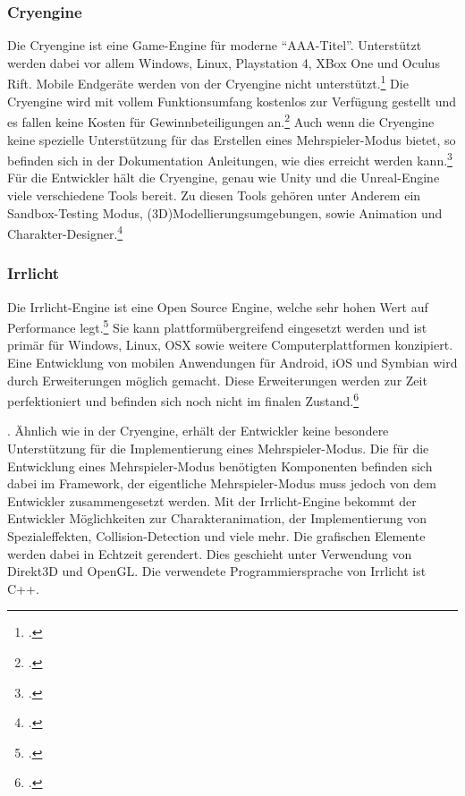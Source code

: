 	\subsubsection*{Cryengine}
	Die Cryengine ist eine Game-Engine für moderne \enquote{AAA-Titel}. Unterstützt werden dabei vor allem Windows, Linux, Playstation 4, XBox One und Oculus Rift. Mobile Endgeräte werden von der Cryengine nicht unterstützt.\footcite[\url{https://www.cryengine.com/features/platforms}]{cry-home} Die Cryengine wird mit vollem Funktionsumfang kostenlos zur Verfügung gestellt und es fallen keine Kosten für Gewinnbeteiligungen an.\footcite[\url{https://www.cryengine.com/features}]{cry-home} Auch wenn die Cryengine keine spezielle Unterstützung für das Erstellen eines Mehrspieler-Modus bietet, so befinden sich in der Dokumentation Anleitungen, wie dies erreicht werden kann.\footcite[\url{http://docs.cryengine.com/display/SDKDOC2/Multiplayer}]{cry-home} Für die Entwickler hält die Cryengine, genau wie Unity und die Unreal-Engine viele verschiedene Tools bereit. Zu diesen Tools gehören unter Anderem ein Sandbox-Testing Modus, (3D)Modellierungsumgebungen, sowie Animation und Charakter-Designer.\footcite[\url{https://www.cryengine.com/features}]{cry-home}

	\subsubsection*{Irrlicht}
	Die Irrlicht-Engine ist eine Open Source Engine, welche sehr hohen Wert auf Performance legt.\footcite[\url{http://irrlicht.sourceforge.net/}]{irrlicht-home} Sie kann plattformübergreifend eingesetzt werden und ist primär für Windows, Linux, OSX sowie weitere Computerplattformen konzipiert. Eine Entwicklung von mobilen Anwendungen für Android, iOS und Symbian wird durch Erweiterungen möglich gemacht. Diese Erweiterungen werden zur Zeit perfektioniert und befinden sich noch nicht im finalen Zustand.\footcite[\url{http://irrlicht.sourceforge.net/?page\_id=45}]{irrlicht-home}. Ähnlich wie in der Cryengine, erhält der Entwickler keine besondere Unterstützung für die Implementierung eines Mehrspieler-Modus. Die für die Entwicklung eines Mehrspieler-Modus benötigten Komponenten befinden sich dabei im Framework, der eigentliche Mehrspieler-Modus muss jedoch von dem Entwickler zusammengesetzt werden.\footnotemark{} Mit der Irrlicht-Engine bekommt der Entwickler Möglichkeiten zur Charakteranimation, der Implementierung von Spezialeffekten, Collision-Detection und viele mehr. Die grafischen Elemente werden dabei in Echtzeit gerendert. Dies geschieht unter Verwendung von Direkt3D und OpenGL. Die verwendete Programmiersprache von Irrlicht ist C++.\footnotemark{}


